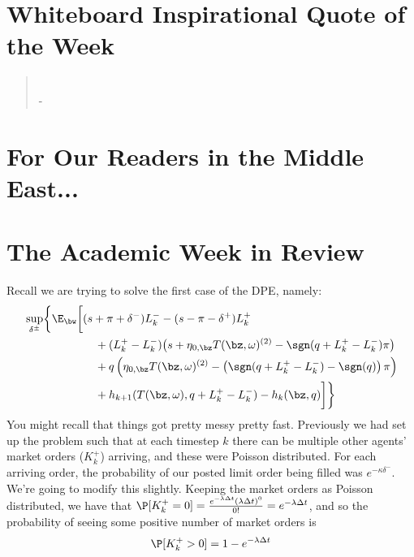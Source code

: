 \documentclass[12pt]{article}
\begin{document}
\newpage
\section*{Whiteboard Inspirational Quote of the Week}
\begin{quote}
\textit{} \\- 
\end{quote} 

\section*{For Our Readers in the Middle East...}

\section*{The Academic Week in Review}
Recall we are trying to solve the first case of the DPE, namely:
\begin{equation}
\label{eq:discretesup1}
\begin{split}
& \sup_{\delta^\pm} \biggl\lbrace \E_{\bw} \biggl[
(s + \pi + \delta^-)L_k^- - (s - \pi - \delta^+)L_k^+ \\
& \hphantom{\sup_{\bu} \biggl\lbrace \E_{\bw} \biggl[ {}+{}} + (L_k^+ - L_k^-) \bigl( s + \eta_{0,\bz} T(\bz, \omega)^{(2)}  -\sgn( q + L_k^+ - L_k^-)\pi   \bigr) \\
& \hphantom{\sup_{\bu} \biggl\lbrace \E_{\bw} \biggl[ {}+{}} + q\left( \eta_{0,\bz} T(\bz, \omega)^{(2)}  -\left( \sgn( q + L_k^+ - L_k^-) - \sgn(q) \right) \pi \right) \\
& \hphantom{\sup_{\bu} \biggl\lbrace \E_{\bw} \biggl[ {}+{}} + h_{k+1}(T(\bz,\omega), q + L_k^+ - L_k^- ) -  h_k(\bz,q) \biggr] \biggr\rbrace
\end{split}
\end{equation}
You might recall that things got pretty messy pretty fast. Previously we had set up the problem such that at each timestep $k$ there can be multiple other agents' market orders ($K_k^+$) arriving, and these were Poisson distributed. For each arriving order, the probability of our posted limit order being filled was $e^{-\kappa \delta^-}$. We're going to modify this slightly. Keeping the market orders as Poisson distributed, we have that $\P [ K_k^+ = 0] = \frac{e^{-\lambda \Delta t} (\lambda \Delta t)^0}{0!} = e^{-\lambda \Delta t}$, and so the probability of seeing some positive number of market orders is
\begin{equation}
\label{eq:discretepositiveKplus}
\P [ K_k^+ > 0] = 1 - e^{-\lambda \Delta t}
\end{equation}
\end{document}
